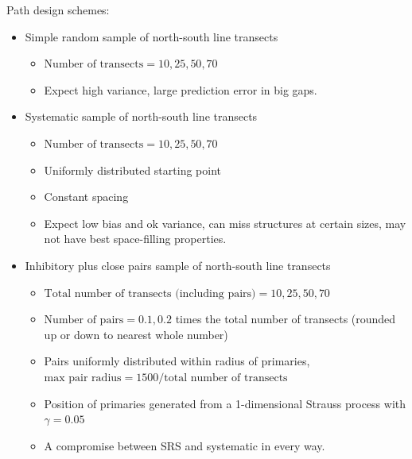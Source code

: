 \documentclass[review]{elsarticle}
\begin{document}
Path design schemes:
\begin{itemize}
\item Simple random sample of north-south line transects
\begin{itemize}
\item \(\text{Number of transects} = 10, 25, 50, 70\)
\item Expect high variance, large prediction error in big gaps.
\end{itemize}
\item Systematic sample of north-south line transects
\begin{itemize}
\item \(\text{Number of transects} = 10, 25, 50, 70\)
\item Uniformly distributed starting point
\item Constant spacing
\item Expect low bias and ok variance, can miss structures at certain sizes,
may not have best space-filling properties.
\end{itemize}
\item Inhibitory plus close pairs sample of north-south line transects
\begin{itemize}
\item \(\text{Total number of transects (including pairs)} = 10, 25, 50, 70\)
\item \(\text{Number of pairs} = 0.1, 0.2\) times the total number of transects
(rounded up or down to nearest whole number)
\item Pairs uniformly distributed within radius of primaries,
\(\text{max pair radius} = 1500 / \text{total number of transects}\)
\item Position of primaries generated from a 1-dimensional Strauss process with
\(\gamma = 0.05\)
\item A compromise between SRS and systematic in every way.


\end{itemize}
\end{itemize}
\end{document}
